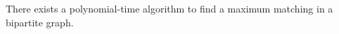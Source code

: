 \begin{Theorem}
There exists a polynomial-time algorithm to find a maximum matching
in a bipartite graph.
\end{Theorem}
%
%
